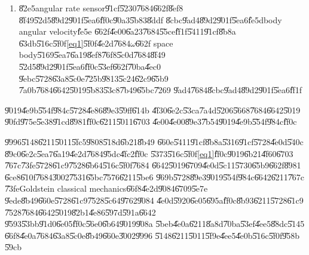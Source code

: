 \documentclass[12pt,a4paper]{article}
\begin{document}
\begin{enumerate}
\item \U{82e5}angular rate sensor\U{91cf}\U{5230}\U{7684}\U{662f}\U{8ef8}%
\U{8f49}\U{52d5}\U{89d2}\U{901f}\U{5ea6}\U{ff0c}\U{90a3}\U{5b83}\U{8ddf}%
\U{8cbc}\U{9ad4}\U{89d2}\U{901f}\U{5ea6}\U{fe5d}body angular velocity\U{fe5e}%
\U{662f}\U{4e00}\U{6a23}\U{7684}\U{55ce}\U{ff1f}\U{5411}\U{91cf}\U{8b8a}%
\U{63db}\U{516c}\U{5f0f}\ref{eq1}\U{5f0f}\U{4e2d}\U{7684}$\omega $\U{662f}%
space body\U{5169}\U{5ea7}\U{6a19}\U{8ef8}\U{76f8}\U{5c0d}\U{7684}\U{8f49}%
\U{52d5}\U{89d2}\U{901f}\U{5ea6}\U{ff0c}\U{53ef}\U{662f}\U{70ba}\U{4ec0}%
\U{9ebc}\U{5728}\U{63a8}\U{5c0e}\U{725b}\U{9813}\U{5c24}\U{62c9}\U{65b9}%
\U{7a0b}\U{7684}\U{6642}\U{5019}\U{5b83}\U{53c8}\U{7b49}\U{65bc}\U{7269}%
\U{9ad4}\U{7684}\U{8cbc}\U{9ad4}\U{89d2}\U{901f}\U{5ea6}\U{ff1f}
\end{enumerate}

\U{9019}\U{4e9b}\U{554f}\U{984c}\U{5728}\U{4e86}\U{89e3}\U{59ff}\U{614b}%
\U{4f30}\U{6e2c}\U{53ca}\U{7a4d}\U{5206}\U{5668}\U{7684}\U{6642}\U{5019}%
\U{90fd}\U{975e}\U{5e38}\U{91cd}\U{8981}\U{ff0c}\U{6211}\U{5011}\U{6703}%
\U{4e00}\U{4e00}\U{89e3}\U{7b54}\U{9019}\U{4e9b}\U{554f}\U{984c}\U{ff0c}

\bigskip

\U{9996}\U{5148}\U{6211}\U{5011}\U{5fc5}\U{9808}\U{518d}\U{6b21}\U{8b49}%
\U{660e}\U{5411}\U{91cf}\U{8b8a}\U{5316}\U{91cf}\U{5728}\U{4e0d}\U{540c}%
\U{89c0}\U{6e2c}\U{5ea7}\U{6a19}\U{4e2d}\U{7684}\U{95dc}\U{4fc2}\U{ff0c}%
\U{5373}\U{516c}\U{5f0f}\ref{eq1}\U{ff0c}\U{9019}\U{6b21}\U{4f60}\U{6703}%
\U{767c}\U{73fe}\U{5728}\U{61c9}\U{7528}\U{6b64}\U{516c}\U{5f0f}\U{7684}%
\U{6642}\U{5019}\U{6709}\U{4e0d}\U{5c11}\U{5730}\U{65b9}\U{662f}\U{8981}%
\U{6ce8}\U{610f}\U{7684}\U{3002}\U{7531}\U{65bc}\U{7576}\U{6211}\U{5be6}%
\U{969b}\U{5728}\U{89e3}\U{9019}\U{554f}\U{984c}\U{6642}\U{6211}\U{767c}%
\U{73fe}Goldstein classical mechanics\U{66f8}\U{4e2d}\U{9084}\U{6709}\U{5e7e}%
\U{9ede}\U{8b49}\U{660e}\U{5728}\U{61c9}\U{7528}\U{5c64}\U{9762}\U{9084}%
\U{4e0d}\U{5920}\U{6e05}\U{695a}\U{ff0c}\U{8b93}\U{6211}\U{5728}\U{61c9}%
\U{7528}\U{7684}\U{6642}\U{5019}\U{82b1}\U{4e86}\U{597d}\U{591a}\U{6642}%
\U{9593}\U{53bb}\U{91d0}\U{6e05}\U{ff0c}\U{56e0}\U{6b64}\U{9019}\U{908a}%
\U{5beb}\U{4e0a}\U{6211}\U{8a8d}\U{70ba}\U{53ef}\U{4ee5}\U{88dc}\U{5145}%
\U{66f8}\U{4e0a}\U{7684}\U{63a8}\U{5c0e}\U{8b49}\U{660e}\U{3002}\U{9996}%
\U{5148}\U{6211}\U{5011}\U{5f9e}\U{4ee5}\U{4e0b}\U{516c}\U{5f0f}\U{958b}%
\U{59cb}
\end{document}
